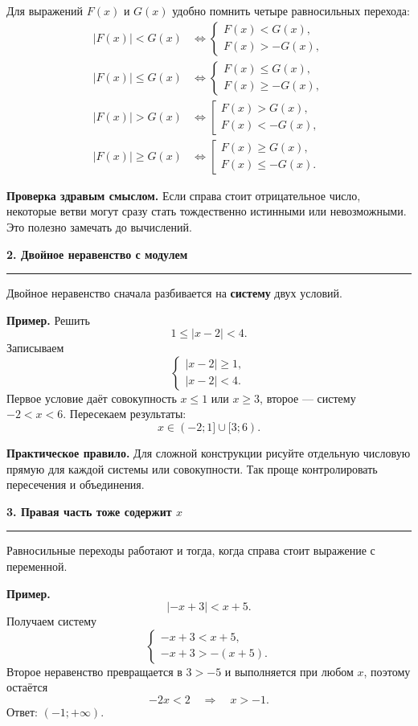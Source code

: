 \documentclass[a4paper,12pt]{article}
\newcommand{\lessonsection}[1]{%
  \vspace{0.5em}
  {\Large\bfseries\color{darkaccent}#1}\par\vspace{0.35em}
  {\color{accent}\rule{\linewidth}{0.6pt}}\vspace{0.6em}
}
\newcommand{\key}[1]{\textbf{\color{darkaccent}#1}}
\begin{document}
Для выражений $F(x)$ и $G(x)$ удобно помнить четыре равносильных перехода:
\[
\begin{aligned}
|F(x)|<G(x)
&\iff
\begin{cases}
F(x)<G(x),\\
F(x)>-G(x),
\end{cases}
\\[1ex]
|F(x)|\le G(x)
&\iff
\begin{cases}
F(x)\le G(x),\\
F(x)\ge -G(x),
\end{cases}
\\[1ex]
|F(x)|>G(x)
&\iff
\left[
\begin{array}{l}
F(x)>G(x),\\
F(x)<-G(x),
\end{array}
\right.
\\[1ex]
|F(x)|\ge G(x)
&\iff
\left[
\begin{array}{l}
F(x)\ge G(x),\\
F(x)\le -G(x).
\end{array}
\right.
\end{aligned}
\]

\key{Проверка здравым смыслом.} Если справа стоит отрицательное число, некоторые ветви могут сразу стать тождественно истинными или невозможными. Это полезно замечать до вычислений.

\lessonsection{2. Двойное неравенство с модулем}

Двойное неравенство сначала разбивается на \key{систему} двух условий.

\textbf{Пример.} Решить
\[
1\le |x-2|<4.
\]
Записываем
\[
\begin{cases}
|x-2|\ge1,\\
|x-2|<4.
\end{cases}
\]
Первое условие даёт совокупность $x\le1$ или $x\ge3$, второе --- систему $-2<x<6$. Пересекаем результаты:
\[
\boxed{x\in(-2;1]\cup[3;6)}.
\]

\key{Практическое правило.} Для сложной конструкции рисуйте отдельную числовую прямую для каждой системы или совокупности. Так проще контролировать пересечения и объединения.

\lessonsection{3. Правая часть тоже содержит $x$}

Равносильные переходы работают и тогда, когда справа стоит выражение с переменной.

\textbf{Пример.}
\[
|-x+3|<x+5.
\]
Получаем систему
\[
\begin{cases}
-x+3<x+5,\\
-x+3>-(x+5).
\end{cases}
\]
Второе неравенство превращается в $3>-5$ и выполняется при любом $x$, поэтому остаётся
\[
-2x<2\quad\Longrightarrow\quad x>-1.
\]
Ответ: $(-1;+\infty)$.
\end{document}
